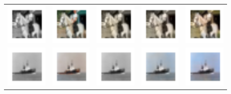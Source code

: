 \documentclass{article}
\begin{document}
\begin{table}[h!]
\begin{tabular}{ccccc}
    \includegraphics[width=2cm]{results3/56-bw.png} & \includegraphics[width=2cm]{results3/56-gt.png} & \includegraphics[width=2cm]{results5/56-relucnn.png} & \includegraphics[width=2cm]{results5/56-tanhcnn.png} & \includegraphics[width=2cm]{results3/56-gan.png} \\
    \includegraphics[width=2cm]{results3/72-bw.png} & \includegraphics[width=2cm]{results3/72-gt.png} & \includegraphics[width=2cm]{results5/72-relucnn.png} & \includegraphics[width=2cm]{results5/72-tanhcnn.png} & \includegraphics[width=2cm]{results3/72-gan.png} \\

\end{tabular}
\end{table}
\end{document}
